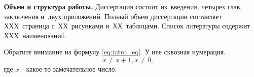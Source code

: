 \textbf{Объем и структура работы.} Диссертация состоит из~введения, четырех глав, заключения и~двух приложений. Полный объем диссертации составляет ХХХ~страница с~ХХ~рисунками и~ХХ~таблицами. Список литературы содержит ХХХ~наименований.

Обратите внимание на формулу \ref{eq:intro_eq}. У нее сквозная нумерация.
\begin{equation}
  \label{eq:intro_eq}
  x \ne x + 1, x \ne 0,
\end{equation}
где ${x}$ - какое-то замечательное число.

\clearpage
